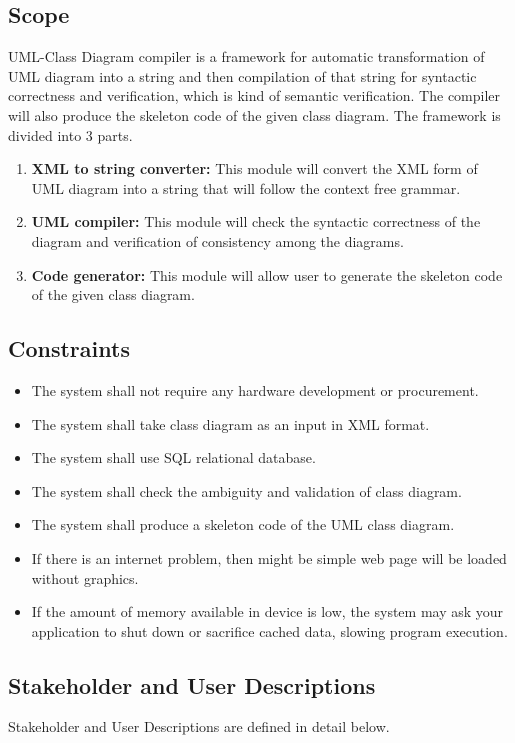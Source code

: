 \documentclass[12pt,a4paper]{article}
\begin{document}
\subsection{Scope}
UML-Class Diagram compiler is a framework for automatic transformation of UML diagram into a string and then compilation of that string for syntactic correctness and verification, which is kind of semantic verification. The compiler will also produce the skeleton code of the given class diagram. The framework is divided into 3 parts.
\begin{enumerate}
    \item \textbf{XML to string converter:} This module will convert the XML form of UML diagram into a string that will follow the context free grammar.
    \item \textbf{UML compiler:} This module will check the syntactic correctness of the diagram and verification of consistency among the diagrams. 
    \item \textbf{Code generator:} This module will allow user to generate the skeleton code of the given class diagram. 
\end{enumerate}
\subsection{Constraints}
	\begin{itemize}
	\item The system shall not require any hardware development or procurement.
    \item The system shall take class diagram as an input in XML format.
    \item The system shall use SQL relational database.
    \item The system shall check the ambiguity and validation of class diagram.
    \item The system shall produce a skeleton code of the UML class diagram.
    \item If there is an internet problem, then might be simple web page will be loaded without graphics.
    \item If the amount of memory available in device is low, the system may ask your application to shut down or sacrifice cached data, slowing program execution.
	\end{itemize}
	
\subsection{Stakeholder and User Descriptions}
	Stakeholder and User Descriptions are defined in detail below.
\end{document}
